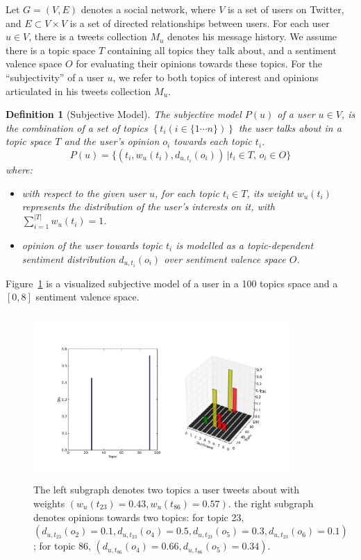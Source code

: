 \documentclass[letterpaper]{article}
\newtheorem{definition}{Definition}
\begin{document}
Let $G=\left( V,E \right) $ denotes a social network, where $ V $ is a set of users on Twitter, and $ E\subset V\times V $ is a set of directed relationships between users. For each user $ u \in V $, there is a tweets collection $ M_{u} $ denotes his message history. We assume there is a topic space $ T $ containing all topics they talk about, and a sentiment valence space $ O $ for evaluating their opinions towards these topics. 
For the ``subjectivity'' of a user $ u $, we refer to both topics of interest and opinions articulated in his tweets collection $ M_{u} $.  
\begin{definition}[Subjective Model]
The subjective model $ P \left( u \right) $ of a user $u \in V $, is the combination of a set of topics $\left\lbrace  t_{i} \left( i \in \lbrace1 \cdots n \rbrace \right)  \right\rbrace $ the user talks about in a topic space $T$ and the user's opinion $o_{i}$ towards each topic $ t_{i} $. 
\begin{equation}
\label{usermodel}
P \left( u \right) = \lbrace \left( t_{i}, w_{u} \left( t_{i} \right), d_{u,t_{i}} \left( o_{i} \right) \right) \,\vert  t_{i} \in T, \, o_{i} \in O \rbrace
\end{equation}
where:
\begin{itemize}
\item with respect to the given user $ u $,  for each topic $t_{i} \in T$, its  weight $ w_{u} \left( t_{i} \right)$ represents the distribution of the user's interests on it, with $ \sum_{i=1}^{|T|}w_{u} \left( t_{i} \right)=1 $.
\item opinion of the user towards topic $t_{i}$ is modelled as a topic-dependent sentiment distribution  $d_{u,t_{i}} \left( o_{i} \right)$ over sentiment valence space $ O $.
\end{itemize}
\end{definition}
Figure~\ref{fig0} is a visualized subjective model of a user in a 100 topics space and a $ [0,8] $ sentiment valence space. 
\begin{figure}[htb]
\includegraphics[width=3.8in,height=2.5in]{fig1.pdf}
\caption{The left subgraph denotes two topics a user tweets about with weights $ \left( w_{u}\left( t_{23} \right)=0.43, w_{u}\left( t_{86} \right)=0.57\right)  $. the right subgraph denotes opinions towards two topics: for topic 23, $ ( d_{u,t_{23}} \left( o_{2} \right)=0.1, d_{u,t_{23}} \left( o_{4} \right)=0.5,d_{u,t_{23}} \left( o_{5} \right)=0.3,d_{u,t_{23}} \left( o_{6} \right)=0.1) $; for topic 86, $ \left( d_{u,t_{86}} \left( o_{4} \right)=0.66, d_{u,t_{86}} \left( o_{5} \right)=0.34 \right) $.}
\label{fig0}
\end{figure}
\end{document}
